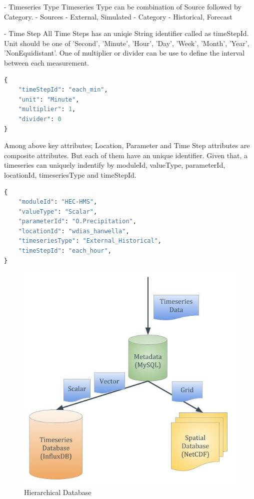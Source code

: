 - Timeseries Type
Timeseries Type can be combination of Source followed by Category.
  - Sources - External, Simulated
  - Category - Historical, Forecast

- Time Step
All Time Steps has an uniqie String identifier called as timeStepId. Unit should be one of 'Second', 'Minute', 'Hour', 'Day', 'Week', 'Month', 'Year', 'NonEquidistant'. One of multiplier or divider can be use to define the interval between each measurement.
\begin{lstlisting}[language=Python]
{
    "timeStepId": "each_min",
    "unit": "Minute",
    "multiplier": 1,
    "divider": 0
}
\end{lstlisting}

Among above key attributes; Location, Parameter and Time Step attributes are composite attributes. But each of them have an unique identifier.
Given that, a timeseries can uniquely indentify by moduleId, valueType, parameterId, locationId, timeseriesType and timeStepId.
\begin{lstlisting}[language=Python]
{
	"moduleId": "HEC-HMS",
	"valueType": "Scalar",
	"parameterId": "O.Precipitation",
	"locationId": "wdias_hanwella",
	"timeseriesType": "External_Historical",
	"timeStepId": "each_hour",
}
\end{lstlisting}

\begin{figure}[htp]
    \centering
    \includegraphics[width=1\textwidth]{method/microservice/hierarchical_database.jpg}
    \caption{Hierarchical Database}
    \label{fi:hierarchical_database}
\end{figure}

